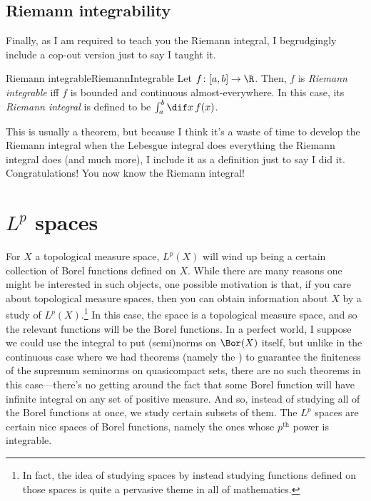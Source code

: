 \subsection{Riemann integrability}

Finally, as I am required to teach you the Riemann integral, I begrudgingly include a cop-out version just to say I taught it.
\begin{dfn}{Riemann integrable}{RiemannIntegrable}
Let $f\colon [a,b]\rightarrow \R$.  Then, $f$ is \emph{Riemann integrable} iff $f$ is bounded and continuous almost-everywhere.  In this case, its \emph{Riemann integral} is defined to be $\int _a^b\dif x\, f(x)$.
\begin{rmk}
This is usually a theorem, but because I think it's a waste of time to develop the Riemann integral when the Lebesgue integral does everything the Riemann integral does (and much more), I include it as a definition just to say I did it.  Congratulations!  You now know the Riemann integral!
\end{rmk}
\end{dfn}

\section{\texorpdfstring{$L^p$}{Lp} spaces}\label{Lp}

For $X$ a topological measure space, $L^p(X)$ will wind up being a certain collection of Borel functions defined on $X$.  While there are many reasons one might be interested in such objects, one possible motivation is that, if you care about topological measure spaces, then you can obtain information about $X$ by a study of $L^p(X)$.\footnote{In fact, the idea of studying spaces by instead studying functions defined on those spaces is quite a pervasive theme in all of mathematics.} In this case, the space is a topological measure space, and so the relevant functions will be the Borel functions.  In a perfect world, I suppose we could use the integral to put (semi)norms on $\Bor (X)$ itself, but unlike in the continuous case where we had theorems (namely the ) to guarantee the finiteness of the supremum seminorms on quasicompact sets, there are no such theorems in this case---there's no getting around the fact that some Borel function will have infinite integral on any set of positive measure.  And so, instead of studying all of the Borel functions at once, we study certain subsets of them.  The $L^p$ spaces are certain nice spaces of Borel functions, namely the ones whose $p^{\text{th}}$ power is integrable.

